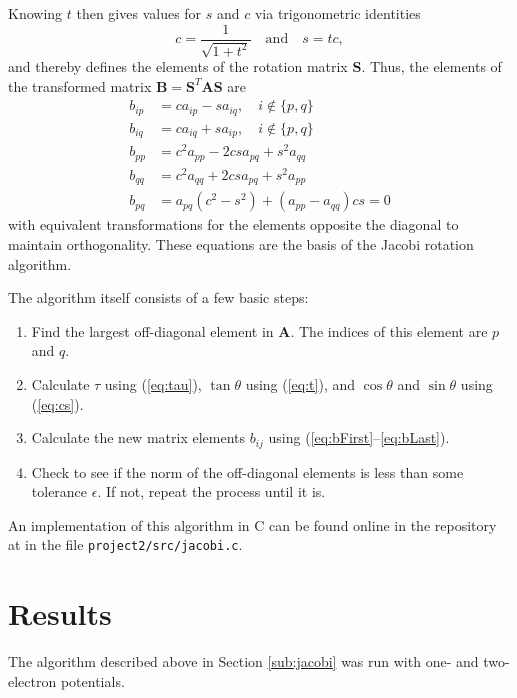 \documentclass[aps,prc,reprint,nobalancelastpage]{revtex4-1}
\begin{document}
        Knowing $t$ then gives values for $s$ and $c$ via trigonometric identities
        \begin{equation}
            c = \frac{1}{\sqrt{1 + t^2}} \quad \text{and}\quad s = tc, \label{eq:cs}
        \end{equation}
        and thereby defines the elements of the rotation matrix $\mathbf{S}$. Thus, the elements of the transformed matrix $\mathbf{B} = \mathbf{S}^T \mathbf{A} \mathbf{S}$ are
        \begin{align}
            b_{ip} &= ca_{ip} - sa_{iq}, \quad i \notin \{p, q\} \label{eq:bFirst}\\
            b_{iq} &= ca_{iq} + sa_{ip}, \quad i \notin \{p, q\} \\
            b_{pp} &= c^2 a_{pp} - 2csa_{pq} + s^2 a_{qq} \\
            b_{qq} &= c^2 a_{qq} + 2csa_{pq} + s^2 a_{pp} \\
            b_{pq} &= a_{pq}(c^2-s^2) + (a_{pp} - a_{qq}) cs = 0 \label{eq:bLast}
        \end{align}
        with equivalent transformations for the elements opposite the diagonal to maintain orthogonality. These equations are the basis of the Jacobi rotation algorithm.

        The algorithm itself consists of a few basic steps:
        \begin{enumerate}
            \item Find the largest off-diagonal element in $\mathbf{A}$. The indices of this element are $p$ and $q$.
            \item Calculate $\tau$ using (\ref{eq:tau}), $\tan\theta$ using (\ref{eq:t}), and $\cos\theta$ and $\sin\theta$ using (\ref{eq:cs}).
            \item Calculate the new matrix elements $b_{ij}$ using (\ref{eq:bFirst}--\ref{eq:bLast}).
            \item Check to see if the norm of the off-diagonal elements is less than some tolerance $\epsilon$. If not, repeat the process until it is.
        \end{enumerate}
        An implementation of this algorithm in C can be found online in the repository at \cite{github} in the file \texttt{project2/src/jacobi.c}.

\section{Results}
\label{sec:results}
    The algorithm described above in Section \ref{sub:jacobi} was run with one- and two-electron potentials.
\end{document}
